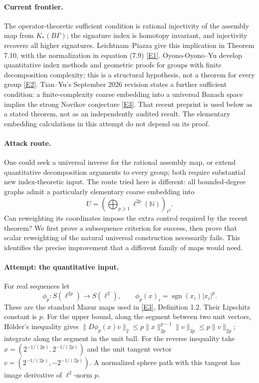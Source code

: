 \documentclass[11pt,a4paper]{article}
\newcommand{\N}{\mathbb{N}}
\newcommand{\eref}[2]{\hyperlink{extra:#1:#2}{[E#2]}}
\numberwithin{equation}{section}
\begin{document}
\paragraph{Current frontier.}
The operator-theoretic sufficient condition is rational injectivity of the assembly map from $K_*(B\Gamma)$; the signature index is homotopy invariant, and injectivity recovers all higher signatures. Leichtnam--Piazza give this implication in Theorem 7.10, with the normalization in equation (7.9) \eref{56}{1}. Oyono-Oyono--Yu develop quantitative index methods and geometric proofs for groups with finite decomposition complexity; this is a structural hypothesis, not a theorem for every group \eref{56}{2}. Tian--Yu's September 2026 revision states a further sufficient condition: a finite-complexity coarse embedding into a universal Banach space implies the strong Novikov conjecture \eref{56}{3}. That recent preprint is used below as a stated theorem, not as an independently audited result. The elementary embedding calculations in this attempt do not depend on its proof.

\paragraph{Attack route.}
One could seek a universal inverse for the rational assembly map, or extend quantitative decomposition arguments to every group; both require substantial new index-theoretic input. The route tried here is different: all bounded-degree graphs admit a particularly elementary coarse embedding into
\[
 U=\left(\bigoplus_{p\geq1}\ell^{2p}(\N)\right)_{\ell^2}.
\]
Can reweighting its coordinates impose the extra control required by the recent theorem? We first prove a subsequence criterion for success, then prove that scalar reweighting of the natural universal construction necessarily fails. This identifies the precise improvement that a different family of maps would need.

\paragraph{Attempt: the quantitative input.}
For real sequences let
\[
 \phi_p:S(\ell^{2p})\longrightarrow S(\ell^2),\qquad
 \phi_p(x)_i=\operatorname{sgn}(x_i)|x_i|^p.
\]
These are the standard Mazur maps used in \eref{56}{3}, Definition 1.2. Their Lipschitz constant is $p$. For the upper bound, along the segment between two unit vectors, H\"older's inequality gives
$\|D\phi_p(x)v\|_2\leq p\|x\|_{2p}^{p-1}\|v\|_{2p}\leq p\|v\|_{2p}$; integrate along the segment in the unit ball. For the reverse inequality take
$x=(2^{-1/(2p)},2^{-1/(2p)})$ and the unit tangent vector
$v=(2^{-1/(2p)},-2^{-1/(2p)})$. A normalized sphere path with this tangent has image derivative of $\ell^2$-norm $p$.
\end{document}
